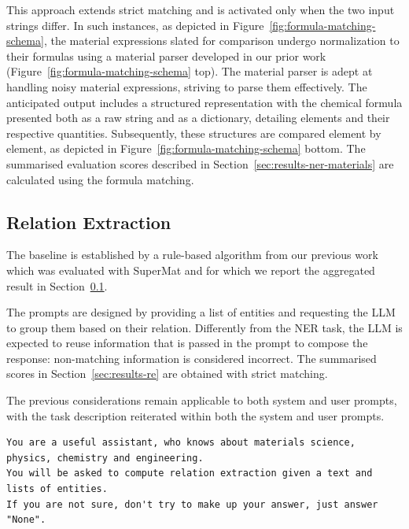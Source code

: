 \documentclass[a4paper]{article}
\begin{document}


This approach extends strict matching and is activated only when the two input strings differ. In such instances, as depicted in Figure~\ref{fig:formula-matching-schema}, the material expressions slated for comparison undergo normalization to their formulas using a material parser developed in our prior work~\cite{lfoppiano2023automatic} (Figure~\ref{fig:formula-matching-schema} top). The material parser is adept at handling noisy material expressions, striving to parse them effectively. The anticipated output includes a structured representation with the chemical formula presented both as a raw string and as a dictionary, detailing elements and their respective quantities. Subsequently, these structures are compared element by element, as depicted in Figure~\ref{fig:formula-matching-schema} bottom.
The summarised evaluation scores described in Section~\ref{sec:results-ner-materials} are calculated using the formula matching. 

\subsection{Relation Extraction}
\label{sec:re}
The baseline is established by a rule-based algorithm from our previous work~\cite{lfoppiano2023automatic} which was evaluated with SuperMat and for which we report the aggregated result in Section~\ref{sec:re}. 

The prompts are designed by providing a list of entities and requesting the LLM to group them based on their relation. 
Differently from the NER task, the LLM is expected to reuse information that is passed in the prompt to compose the response: non-matching information is considered incorrect.
The summarised scores in Section~\ref{sec:results-re} are obtained with strict matching. 

The previous considerations remain applicable to both system and user prompts, with the task description reiterated within both the system and user prompts. 

\begin{lstlisting}[caption=System prompt for RE modified by emphasising the tasks]
You are a useful assistant, who knows about materials science, physics, chemistry and engineering.
You will be asked to compute relation extraction given a text and lists of entities. 
If you are not sure, don't try to make up your answer, just answer "None". 
\end{lstlisting}
\end{document}
